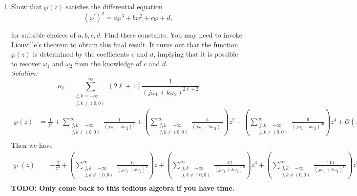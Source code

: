 \documentclass[10pt]{amsart}
\theoremstyle{nonumberplain}
\begin{document}
\begin{enumerate}[label={\bf {\arabic*}:}]
\begin{enumerate}
\item Show that $\wp(z)$ satisfies the differential equation
$$ \left(\wp^{\prime}\right)^2=a \wp^3+b \wp^2+c \wp+d, $$

for suitable choices of $a, b, c, d$. Find these constants. You may need to invoke Liouville's theorem to obtain this final result. It turns out that the function $\wp(z)$ is determined by the coefficients $c$ and $d$, implying that it is possible to recover $\omega_1$ and $\omega_2$ from the knowledge of $c$ and $d$. \\

\noindent
\textit{Solution:} \\
$$ \alpha_\ell = \sum_{\substack{j, k=-\infty \\ j,k \neq (0,0)}}^{\infty} (2\ell + 1) \frac 1 {\left( j \omega_1 + k \omega_2\right)^{2\ell + 2}} $$
\begin{align*}
\wp(z) &= \frac{1}{z^2}
	+ \sum_{\substack{j, k=-\infty \\ j,k \neq (0,0)}}^{\infty} \frac 1 {\left( j \omega_1 + k \omega_2\right)^2}
	+ \left( \sum_{\substack{j, k=-\infty \\ j,k \neq (0,0)}}^{\infty} \frac 5 {\left( j \omega_1 + k \omega_2\right)^6} \right) z^2
	+ \left( \sum_{\substack{j, k=-\infty \\ j,k \neq (0,0)}}^{\infty} \frac 9 {\left( j \omega_1 + k \omega_2\right)^{10}} \right) z^4
	+ \mathcal O (z^6) \\
\end{align*}
Then we have
\begin{align*}
\wp^\prime(z) &= -\frac{2}{z^3}
	+ \left( \sum_{\substack{j, k=-\infty \\ j,k \neq (0,0)}}^{\infty} \frac 6 {\left( j \omega_1 + k \omega_2\right)^4} \right) z
	+ \left( \sum_{\substack{j, k=-\infty \\ j,k \neq (0,0)}}^{\infty} \frac {42} {\left( j \omega_1 + k \omega_2\right)^8} \right) z^3
	+ \left( \sum_{\substack{j, k=-\infty \\ j,k \neq (0,0)}}^{\infty} \frac {110} {\left( j \omega_1 + k \omega_2\right)^{12}} \right) z^5 
	+ \mathcal O (z^7) \\
\end{align*}
\textbf{TODO: Only come back to this tedious algebra if you have time.}
\\

\end{enumerate}
\end{enumerate}
\end{document}

